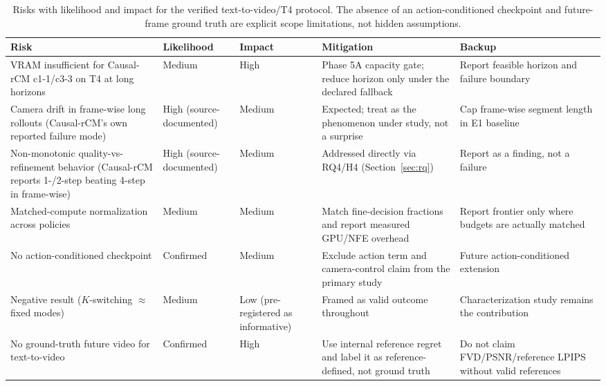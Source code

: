 \documentclass[11pt,a4paper]{article}
\begin{document}
\begin{table}[ht]
\centering
\small
\renewcommand{\arraystretch}{1.35}
\begin{tabularx}{\textwidth}{>{\raggedright\arraybackslash}p{3.3cm} >{\raggedright\arraybackslash}p{1.7cm} >{\raggedright\arraybackslash}p{1.6cm} >{\raggedright\arraybackslash}X >{\raggedright\arraybackslash}X}
\toprule
\textbf{Risk} & \textbf{Likelihood} & \textbf{Impact} & \textbf{Mitigation} & \textbf{Backup} \\
\midrule
VRAM insufficient for Causal-rCM c1-1/c3-3 on T4 at long horizons & Medium & High & Phase 5A capacity gate; reduce horizon only under the declared fallback & Report feasible horizon and failure boundary \\
Camera drift in frame-wise long rollouts (Causal-rCM's own reported failure mode) & High (source-documented) & Medium & Expected; treat as the phenomenon under study, not a surprise & Cap frame-wise segment length in E1 baseline \\
Non-monotonic quality-vs-refinement behavior (Causal-rCM reports 1-/2-step beating 4-step in frame-wise) & High (source-documented) & Medium & Addressed directly via RQ4/H4 (Section~\ref{sec:rq}) & Report as a finding, not a failure \\
Matched-compute normalization across policies & Medium & Medium & Match fine-decision fractions and report measured GPU/NFE overhead & Report frontier only where budgets are actually matched \\
No action-conditioned checkpoint & Confirmed & Medium & Exclude action term and camera-control claim from the primary study & Future action-conditioned extension \\
Negative result ($K$-switching $\approx$ fixed modes) & Medium & Low (pre-registered as informative) & Framed as valid outcome throughout & Characterization study remains the contribution \\
No ground-truth future video for text-to-video & Confirmed & High & Use internal reference regret and label it as reference-defined, not ground truth & Do not claim FVD/PSNR/reference LPIPS without valid references \\
\bottomrule
\end{tabularx}
\caption{Risks with likelihood and impact for the verified text-to-video/T4 protocol. The absence of an action-conditioned checkpoint and future-frame ground truth are explicit scope limitations, not hidden assumptions.}
\label{tab:risks}
\end{table}
\clearpage
\end{document}
